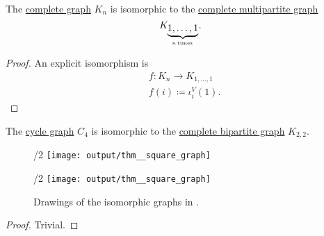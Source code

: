 \begin{proposition}\label{thm:small_complete_multipartite_graph}
  The \hyperref[def:complete_graph]{complete graph} \( K_n \) is isomorphic to the \hyperref[def:complete_multipartite_graph]{complete multipartite graph}
  \begin{equation*}
    K_{\underbrace{1,\ldots,1}_{n \T*{times}}}.
  \end{equation*}
\end{proposition}
\begin{proof}
  An explicit isomorphism is
  \begin{equation*}
    \begin{aligned}
      &f: K_n \to K_{1,\ldots,1} \\
      &f(i) \coloneqq \iota^V_i(1).
    \end{aligned}
  \end{equation*}
\end{proof}

\begin{proposition}\label{thm:square_graph}
  The \hyperref[def:cycle_graph]{cycle graph} \( C_4 \) is isomorphic to the \hyperref[def:complete_multipartite_graph]{complete bipartite graph} \( K_{2,2} \).

  \begin{figure}[!ht]
    \begin{subcaptionblock}{\textwidth/2}
      \centering
      \texttt{[image: output/thm\_\_square\_graph]}
      \caption{\( C_4 \)}\label{fig:thm:square_graph/c4}
    \end{subcaptionblock}
    \hfill
    \begin{subcaptionblock}{\textwidth/2}
      \centering
      \texttt{[image: output/thm\_\_square\_graph]}
      \caption{\( K_{2,2} \)}\label{fig:thm:square_graph/k22}
    \end{subcaptionblock}
    \caption{Drawings of the isomorphic graphs in .}\label{fig:thm:square_graph}
  \end{figure}
\end{proposition}
\begin{proof}
  Trivial.
\end{proof}

